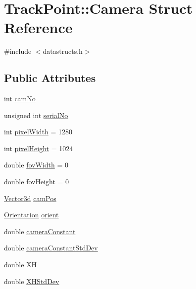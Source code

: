 \hypertarget{struct_track_point_1_1_camera}{}\section{Track\+Point\+::Camera Struct Reference}
\label{struct_track_point_1_1_camera}


{\ttfamily \#include $<$datastructs.\+h$>$}

\subsection*{Public Attributes}
\begin{DoxyCompactItemize}
\item 
int \mbox{\hyperlink{struct_track_point_1_1_camera_a6dd8adf42241867d82a7b9f8f1645477}{cam\+No}}
\item 
unsigned int \mbox{\hyperlink{struct_track_point_1_1_camera_ab50123c3065307a9bb35344962a41f9f}{serial\+No}}
\item 
int \mbox{\hyperlink{struct_track_point_1_1_camera_a270e6a4feb3c2750fb439d94ec461745}{pixel\+Width}} = 1280
\item 
int \mbox{\hyperlink{struct_track_point_1_1_camera_a697d2a795ebb51029872052434d798af}{pixel\+Height}} = 1024
\item 
double \mbox{\hyperlink{struct_track_point_1_1_camera_a793ce86ec2fb9f3874b116586ad9da5f}{fov\+Width}} = 0
\item 
double \mbox{\hyperlink{struct_track_point_1_1_camera_a6af02f2710b285f9e7000b6251b8c4f7}{fov\+Height}} = 0
\item 
\mbox{\hyperlink{struct_vector3d}{Vector3d}} \mbox{\hyperlink{struct_track_point_1_1_camera_a64a3364236cce6d85ed5b8c73f7d7853}{cam\+Pos}}
\item 
\mbox{\hyperlink{struct_orientation}{Orientation}} \mbox{\hyperlink{struct_track_point_1_1_camera_aeaeba606ac5015157ddefd41a250e93d}{orient}}
\item 
double \mbox{\hyperlink{struct_track_point_1_1_camera_a8583ca2ade57b8d3b934ff288451dc87}{camera\+Constant}}
\item 
double \mbox{\hyperlink{struct_track_point_1_1_camera_a581bf919d6e66fe5f8a9767fb3b7ffe9}{camera\+Constant\+Std\+Dev}}
\item 
double \mbox{\hyperlink{struct_track_point_1_1_camera_ab18d2866e8d8859313db237c32be9335}{XH}}
\item 
double \mbox{\hyperlink{struct_track_point_1_1_camera_a62b4164b3f4a9b3a9619142ef02aa11e}{X\+H\+Std\+Dev}}

\end{DoxyCompactItemize}
